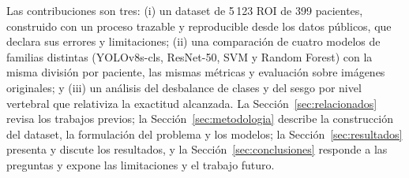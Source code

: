 Las contribuciones son tres: (i) un dataset de 5\,123 ROI de 399 pacientes, construido con un proceso trazable y reproducible desde los datos públicos, que declara sus errores y limitaciones; (ii) una comparación de cuatro modelos de familias distintas (YOLOv8s-cls, ResNet-50, SVM y Random Forest) con la misma división por paciente, las mismas métricas y evaluación sobre imágenes originales; y (iii) un análisis del desbalance de clases y del sesgo por nivel vertebral que relativiza la exactitud alcanzada. La Sección~\ref{sec:relacionados} revisa los trabajos previos; la Sección~\ref{sec:metodologia} describe la construcción del dataset, la formulación del problema y los modelos; la Sección~\ref{sec:resultados} presenta y discute los resultados, y la Sección~\ref{sec:conclusiones} responde a las preguntas y expone las limitaciones y el trabajo futuro.
